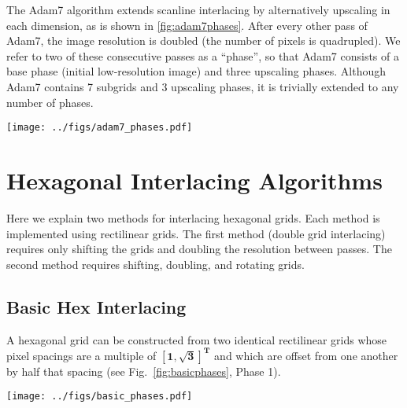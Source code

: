 \documentclass[aip, amsmath, amssymb, nobibnotes, nofootinbib, citeautoscript, reprint, superscriptaddress]{revtex4-1}
\begin{document}
    The Adam7 algorithm extends scanline interlacing by alternatively upscaling in each dimension, as is shown in \autoref{fig:adam7phases}.
    After every other pass of Adam7, the image resolution is doubled (the number of pixels is quadrupled).
    We refer to two of these consecutive passes as a ``phase'', so that Adam7 consists of a base phase (initial low-resolution image) and three upscaling phases.
    Although Adam7 contains 7 subgrids and 3 upscaling phases, it is trivially extended to any number of phases.


    \begin{figure*}
        \centering
        \texttt{[image: ../figs/adam7\_phases.pdf]}
            \caption{
                \label{fig:adam7phases}
                \textbf{The Adam7 interlacing method for rectilinear grids.}
                Starting from an initial grid (Phase 1), each subsequent phase consists of doubling the columns (blue) then rows (green) of the grid.
            }
    \end{figure*}


    \section{Hexagonal Interlacing Algorithms}
    \label{sec:hexinter}

    Here we explain two methods for interlacing hexagonal grids.
    Each method is implemented using rectilinear grids.
    The first method (double grid interlacing) requires only shifting the grids and doubling the resolution between passes.
    The second method requires shifting, doubling, and rotating grids.


    \subsection{\label{ssec:double-grid-interlacing}Basic Hex Interlacing}

    A hexagonal grid can be constructed from two identical rectilinear grids whose pixel spacings are a multiple of $\mathbf{\left[1, \sqrt{3}\right]^T}$ and which are offset from one another by half that spacing (see Fig.~\ref{fig:basicphases}, Phase 1).

    \begin{figure*}
        \centering
        \texttt{[image: ../figs/basic\_phases.pdf]}
        \caption{
            \label{fig:basicphases} 
            \textbf{Refining a hex grid through multiple interlacing passes.}
            In each pass, previously sampled points are shown in gray.
            Each pass consists of multiple rectilinear scans with aspect ratio $\mathbf{\sqrt{3}}$.
            }
    \end{figure*}
\end{document}
